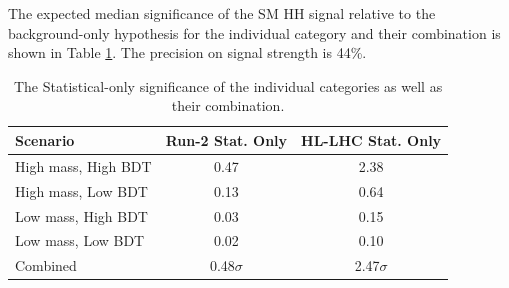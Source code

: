 The expected median significance of the SM HH signal relative to the background-only hypothesis for the individual category and their combination is shown in Table \ref{tab:HL-LHC:Sig}. The precision on signal strength is 44\%.

\begin{table}[htbp]
    \centering
    \begin{tabular}{lcc}
    \hline\hline 
        Scenario & Run-2 Stat. Only & HL-LHC Stat. Only \\
    \hline    
        High mass, High BDT & 0.47 & 2.38 \\
        High mass, Low BDT  & 0.13 & 0.64 \\
        Low mass, High BDT  & 0.03 & 0.15 \\
        Low mass, Low BDT   & 0.02 & 0.10 \\
        \hline
        Combined & 0.48$\sigma$ & 2.47$\sigma$ \\
    \hline\hline 
    \end{tabular}
    \begin{tcolorbox}[colback=black!5!white, colframe=white!75!black]
    \caption{The Statistical-only significance of the individual categories as well as their combination.}
    \label{tab:HL-LHC:Sig}
    \end{tcolorbox}
\end{table}


